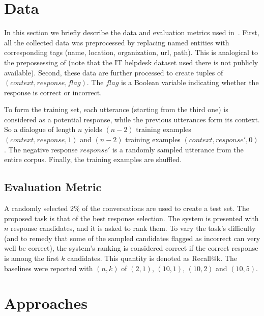 \documentclass{article} \usepackage{nips15submit_e,times}
\newcommand{\MARTINSECOND}[1]{{\color{black}#1}} \newcommand{\MARTINTHIRD}[1]{{\color{black}#1}} \newcommand{\COPY}[1]{{\color{black}[#1]}}
\begin{document}
\MARTINSECOND
{
\section{Data}
In this section we briefly describe the data and evaluation metrics used in~\cite{lowe2015ubuntu}. 
First, all the collected data was preprocessed by replacing named entities with corresponding
tags (name, location, organization, url, path). This is analogical to the prepossessing of \cite{vinyals2015neural} 
(note that the IT helpdesk dataset used there is not publicly available).
Second, these data are further processed to create tuples of $(context, response, flag)$.
The $flag$ is a Boolean variable indicating whether the response is correct
or incorrect.

To form the training set, each utterance (starting from the third one) is considered as a
potential response, while the previous utterances form its context.
So a dialogue of length $n$ yields $(n-2)$ training examples $(context, response, 1)$ and 
$(n-2)$ training examples $(context, response', 0)$.
The negative response $response'$ is a randomly sampled utterance from the entire corpus. 
Finally, the training examples are shuffled.









\subsection{Evaluation Metric}
A randomly selected $2\%$ of the conversations are used to create a test set.
The proposed task is that of the best response selection.
The system is presented with $n$ response candidates, and it is asked to rank them.
To vary the task's difficulty (and to remedy that some of the sampled candidates flagged as incorrect can very well be correct), 
the system's ranking is considered correct if the correct response is among the first $k$ candidates. This quantity is denoted as Recall@k.
The baselines were reported with $(n,k)$ of $(2,1)$, $(10,1)$, $(10,2)$ and $(10,5)$.
}

\section{Approaches}
\end{document}
